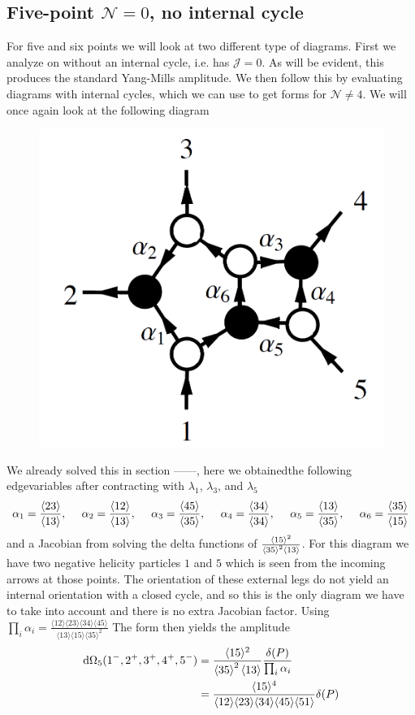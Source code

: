 \documentclass[letter,11pt]{article}
\newcommand{\ab}[1]{\langle #1 \rangle}
\begin{document}
\subsection{Five-point $\mathcal{N}=0$, no internal cycle}
For five and six points we will look at two different type of diagrams. First we analyze on without an internal cycle, i.e. has $\mathcal{J}=0$. As will be evident, this produces  the standard Yang-Mills amplitude. We then follow this by evaluating diagrams with internal cycles, which we can use to get forms for $\mathcal{N}\neq4$.
We will once again look at the following diagram
\begin{figure}[H]
	\centering
	\includegraphics[width=0.3\linewidth]{5pt}
	\caption{}
	\label{fig:5pt}
\end{figure}
We already solved this in section ------, here we obtainedthe following edgevariables after contracting with $\lambda_1$, $\lambda_3$, and $\lambda_5$
\begin{equation}
	\begin{aligned}
		\alpha_1=\frac{\expval{23}}{\expval{13}},~~~~
		\alpha_2=\frac{\expval{12}}{\expval{13}},~~~~
		\alpha_3=\frac{\expval{45}}{\expval{35}},~~~~
		\alpha_4=\frac{\expval{34}}{\expval{34}},~~~~
		\alpha_5=\frac{\expval{13}}{\expval{35}},~~~~
		\alpha_6=\frac{\expval{35}}{\expval{15}}
	\end{aligned}
\end{equation}
and a Jacobian from solving the delta functions of $\frac{\ab{15}^2}{\expval{35}^2\expval{13}}$. For this diagram we have two negative helicity particles $1$ and $5$ which is seen from the incoming arrows at those points. The orientation of these external legs do not yield an internal orientation with a closed cycle, and so this is the only diagram we have to take into account and there is no extra Jacobian factor. Using $\prod_{i}\alpha_i=\frac{\ab{12}\ab{23}\ab{34}\ab{45}}{\ab{13}\ab{15}\ab{35}^2}$ The form then yields the amplitude
\begin{equation}
	\begin{aligned}
		\dd \Omega_5(1^-,2^+,3^+,4^+,5^-)&=\frac{\ab{15}^2}{\expval{35}^2\expval{13}}\frac{\delta(P)}{\prod_i \alpha_i}\\
		&=\frac{\ab{15}^4}{\ab{12}\ab{23}\ab{34}\ab{45}\ab{51}}\delta(P)
	\end{aligned}
\end{equation}
\end{document}
